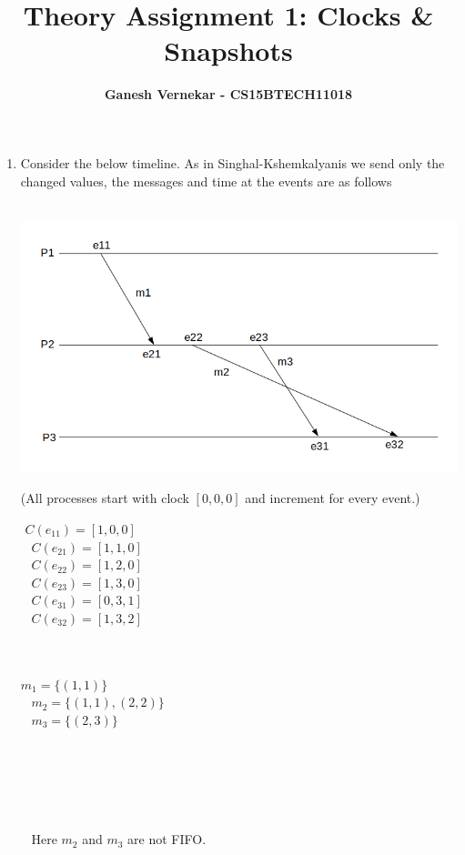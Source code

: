 \documentclass{article}
\title{\huge \textbf{Theory Assignment 1: Clocks \& Snapshots}}
\author{\Large \textbf{Ganesh Vernekar - CS15BTECH11018}}
\date{}
\begin{document}
  \Large
  \maketitle

  \renewcommand{\labelenumii}{\Roman{enumii}}
   \begin{enumerate}
   
   \item %

   Consider the below timeline. As in Singhal-Kshemkalyanis we send only the changed values, the messages and time at the events are as follows \\~

	\includegraphics[scale=0.57]{pic1}
	
	(All processes start with clock $[0, 0, 0]$ and increment for every event.)
	
	\begin{minipage}{0.45\textwidth}
	\begin{center}$ $
	$C(e_{11}) = [1, 0, 0] $   \\~
    $C(e_{21}) = [1, 1, 0] $   \\~
	$C(e_{22}) = [1, 2, 0] $   \\~
	$C(e_{23}) = [1, 3, 0]$   \\~
	$C(e_{31}) = [0, 3, 1] $   \\~
	$C(e_{32}) = [1, 3, 2]$   \\~ \\~
	\end{center}
	\end{minipage}
	\hfill
	\begin{minipage}{0.45\textwidth} 
	$m_1 = \{(1,1)\}$ \\~
    $m_2 = \{(1,1), (2,2)\}$ \\~ 
	$m_3 = \{(2,3)\}$ \\~ 
	\end{minipage}%
\\~\\~\\~\\~
	Here $m_2$ and $m_3$ are not FIFO. \\~
	

\end{enumerate}
\end{document}
